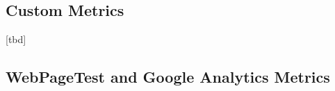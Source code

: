 
















\subsection{Custom Metrics}


[tbd]















\subsection{WebPageTest and Google Analytics Metrics}


